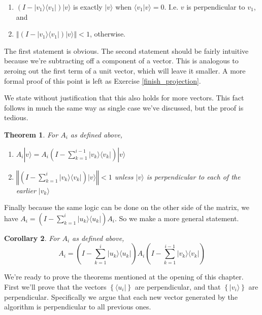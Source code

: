 \documentclass{amsbook}
\newtheorem{theorem}{Theorem}
\newtheorem{corollary}[theorem]{Corollary}
\begin{document}
\begin{enumerate}
\item  $\left(I-| v _1\rangle\langle v _1|\right)| v \rangle$ is exactly $| v \rangle$ when $\langle v _1| v \rangle=0$.  I.e. $ v $ is perpendicular to $ v _1$, and 
\item  $\left\Vert\left(I-| v _1\rangle\langle v _1|\right)| v \rangle\right\Vert < 1$, otherwise.
\end{enumerate}

The first statement is obvious.  The second statement should be fairly intuitive because we're subtracting off a component of a vector.  This is analogous to zeroing out the first term of a unit vector, which will leave it smaller.  A more formal proof of this point is left as Exercise \ref{finish_projection}.

We state without justification that this also holds for more vectors.  This fact follows in much the same way as single case we've discussed, but the proof is tedious.

 \begin{theorem}
\label{lil_projection_thm}
For $A_i$ as defined above,
\begin{enumerate}
\item $A_i| v \rangle=A_i\left(I-\sum_{k=1}^{i-1}| v _k\rangle\langle v _k|\right)| v \rangle$
\item $\left\Vert\left(I-\sum_{k=1}^{i}| v _k\rangle\langle v _k|\right)| v \rangle\right\Vert<1$ unless $| v \rangle$ is perpendicular to each of the earlier $| v _k\rangle$
\end{enumerate}
 \end{theorem}

Finally because the same logic can be done on the other side of the matrix, we have $A_i=\left(I-\sum_{k=1}^i| u _k\rangle\langle u _k|\right)A_i$.  So we make a more general statement.

\begin{corollary}
\label{double_side_proj}
For $A_i$ as defined above,
$$
A_i=\left(I-\sum_{k=1}^i| u _k\rangle\langle u _k|\right)A_i\left(I-\sum_{k=1}^{i-1}| v _k\rangle\langle v _k|\right)
$$
\end{corollary}

We're ready to prove the theorems mentioned at the opening of this chapter.  First we'll prove that the vectors $\left\{\langle u_i|\right\}$ are perpendicular, and that $\left\{|v_i\rangle\right\}$ are perpendicular.  Specifically we argue that each new vector generated by the algorithm is perpendicular to all previous ones.
\end{document}
